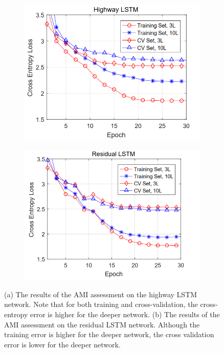 \documentclass[a4paper,12pt]{article}
\theoremstyle{definition}
\begin{document}
\begin{figure}
	\centering
	\begin{subfigure}[b]{0.49\textwidth}
		\includegraphics[width=\textwidth]{figures/highway_lstm_AMI.png}
		\caption{}
		\label{fig:highway_lstm_AMI}
	\end{subfigure}
	\begin{subfigure}[b]{0.49\textwidth}
		\includegraphics[width=\textwidth]{figures/residual_lstm_AMI.png}
		\caption{}
		\label{fig:residual_lstm_AMI}
	\end{subfigure}
	\caption{(a) The results of the AMI assessment on the highway LSTM network. Note that for both training and cross-validation, the cross-entropy error is higher for the deeper network. (b) The results of the AMI assessment on the residual LSTM network. Although the training error is higher for the deeper network, the cross validation error is lower for the deeper network.}
	\label{fig:lstm_AMI}
\end{figure}
\end{document}
